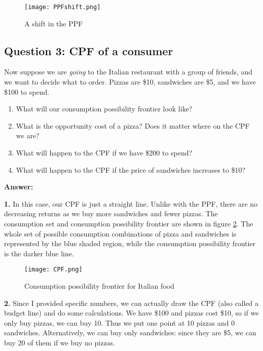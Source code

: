\documentclass[12pt]{article}
\begin{document}
\begin{figure}
    \centering
    \texttt{[image: PPFshift.png]}
    \caption{A shift in the PPF}
    \label{fig:PPFshift}
\end{figure}

\medskip

\subsection*{Question 3: CPF of a consumer}
Now suppose we are \textit{going} to the Italian restaurant with a group of friends, and we want to decide what to order. Pizzas are \$10, sandwiches are \$5, and we have \$100 to spend.
    \begin{enumerate}
        \item What will our consumption possibility frontier look like?
        \item What is the opportunity cost of a pizza? Does it matter where on the CPF we are?
        \item What will happen to the CPF if we have \$200 to spend?
        \item What will happen to the CPF if the price of sandwiches increases to \$10?
    \end{enumerate}

    \medskip

    \textbf{Answer:}

\textbf{1.} In this case, our CPF is just a straight line. Unlike with the PPF, there are no decreasing returns as we buy more sandwiches and fewer pizzas. The consumption set and consumption possibility frontier are shown in figure \ref{fig:CPF}. The whole set of possible consumption combinations of pizza and sandwiches is represented by the blue shaded region, while the consumption possibility frontier is the darker blue line.

\begin{figure}[H]
    \centering
    \texttt{[image: CPF.png]}
    \caption{Consumption possibility frontier for Italian food}
    \label{fig:CPF}
\end{figure}

\textbf{2.} Since I provided specific numbers, we can actually draw the CPF (also called a budget line) and do some calculations. We have \$100 and pizzas cost \$10, so if we only buy pizzas, we can buy 10. Thus we put one point at 10 pizzas and 0 sandwiches. Alternatively, we can buy only sandwiches: since they are \$5, we can buy 20 of them if we buy no pizzas.
\end{document}

